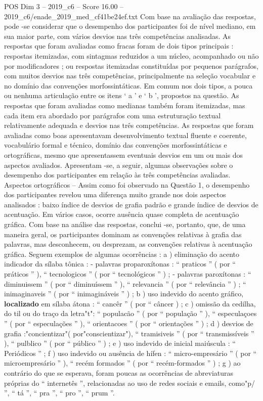 \begin{textsample}{POS Dim 3 – 2019\_c6 – Score 16.00 – 2019\_c6/enade\_2019\_med\_cf41be24ef.txt}
Com base na avaliação das respostas, pode -se considerar que o desempenho dos participantes foi de nível mediano, em sua maior parte, com vários desvios nas três competências analisadas.
As respostas que foram avaliadas como fracas foram de dois tipos principais : respostas itemizadas, com sintagmas reduzidos a um núcleo, acompanhado ou não por modificadores ; ou respostas itemizadas constituídas por pequenos parágrafos, com muitos desvios nas três competências, principalmente na seleção vocabular e no domínio das convenções morfossintáticas.
Em comum nos dois tipos, a pouca ou nenhuma articulação entre os itens ‘ a ’ e ‘ b ’, propostos na questão.
As respostas que foram avaliadas como medianas também foram itemizadas, mas cada item era abordado por parágrafos com uma estruturação textual relativamente adequada e desvios nas três competências.
As respostas que foram avaliadas como boas apresentavam desenvolvimento textual fluente e coerente, vocabulário formal e técnico, domínio das convenções morfossintáticas e ortográficas, mesmo que apresentassem eventuais desvios em um ou mais dos aspectos avaliados.
Apresentam -se, a seguir, algumas observações sobre o desempenho dos participantes em relação às três competências avaliadas.
Aspectos ortográficos – Assim como foi observado na Questão 1, o desempenho dos participantes revelou uma diferença muito grande nos dois aspectos analisados : baixo índice de desvios de grafia padrão e grande índice de desvios de acentuação.
Em vários casos, ocorre ausência quase completa de acentuação gráfica.
Com base na análise das respostas, conclui -se, portanto, que, de uma maneira geral, os participantes dominam as convenções relativas à grafia das palavras, mas desconhecem, ou desprezam, as convenções relativas à acentuação gráfica.
Seguem exemplos de algumas ocorrências : a ) eliminação do acento indicador da sílaba tônica : - palavras proparoxítonas : “ praticos ” ( por “ práticos ” ), “ tecnologicos ” ( por “ tecnológicos ” ) ; - palavras paroxítonas : “ diminuissem ” ( por “ diminuíssem ” ), “ relevancia ” ( por “ relevância ” ) ; “ inimaginaveis ” ( por “ inimagináveis ” ) ; b ) uso indevido do acento gráfico, \textbf{localizado} em sílaba átona : “ cancêr ” ( por “ câncer ) ; c ) omissão da cedilha, do til ou do traço da letra"t": “ populacão ” ( por “ população ” ), “ especulaçoes ” ( por “ especulações ” ), “ orientacoes ” ( por “ orientações ” ) ; d ) desvios de grafia :"concientizar"( por"conscientizar"), “ tramisiveis ” ( por “ transmissíveis ” ), “ pulblico ” ( por “ público ” ) ; e ) uso indevido de inicial maiúscula : “ Periódicos ” ; f ) uso indevido ou ausência de hífen : “ micro-empresário ” ( por “ microempresário ” ), “ recém formados ” ( por “ recém-formados ” ) ; g ) ao contrário do que se esperava, foram poucas as ocorrências de abreviaturas próprias do “ internetês ”, relacionadas ao uso de redes sociais e emails, como"p/ ”, “ tá ”, “ pra ”, “ pro ”, “ prum ”.

\end{textsample}
